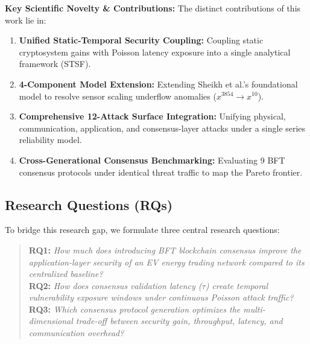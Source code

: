 \documentclass[10pt,twocolumn,journal]{IEEEtran}
\begin{document}
\textbf{Key Scientific Novelty \& Contributions:} The distinct contributions of this work lie in:
\begin{enumerate}[leftmargin=*]
    \item \textbf{Unified Static-Temporal Security Coupling:} Coupling static cryptosystem gains with Poisson latency exposure into a single analytical framework (STSF).
    \item \textbf{4-Component Model Extension:} Extending Sheikh et al.'s foundational model to resolve sensor scaling underflow anomalies ($x^{3854} \to x^{10}$).
    \item \textbf{Comprehensive 12-Attack Surface Integration:} Unifying physical, communication, application, and consensus-layer attacks under a single series reliability model.
    \item \textbf{Cross-Generational Consensus Benchmarking:} Evaluating 9 BFT consensus protocols under identical threat traffic to map the Pareto frontier.
\end{enumerate}


\subsection{Research Questions (RQs)}
To bridge this research gap, we formulate three central research questions:
\begin{quote}
\textbf{RQ1:} \emph{How much does introducing BFT blockchain consensus improve the application-layer security of an EV energy trading network compared to its centralized baseline?} \\
\textbf{RQ2:} \emph{How does consensus validation latency ($\tau$) create temporal vulnerability exposure windows under continuous Poisson attack traffic?} \\
\textbf{RQ3:} \emph{Which consensus protocol generation optimizes the multi-dimensional trade-off between security gain, throughput, latency, and communication overhead?}
\end{quote}
\end{document}
